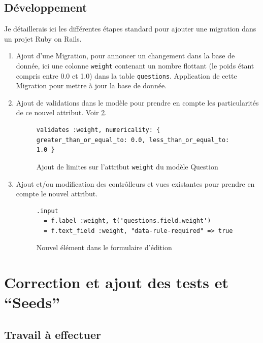 \documentclass[12pt,a4paper]{book}
\begin{document}
\subsection{Développement}

Je détaillerais ici les différentes étapes standard pour ajouter une migration dans un projet Ruby on Rails.

\begin{enumerate}
  \item Ajout d'une Migration, pour annoncer un changement dans la base de donnée, ici une colonne \texttt{weight} contenant un nombre flottant (le poids étant compris entre 0.0 et 1.0) dans la table \texttt{questions}. Application de cette Migration pour mettre à jour la base de donnée.
  \item Ajout de validations dans le modèle pour prendre en compte les particularités de ce nouvel attribut. Voir \cref{fig.weight_validation}.
  
  \begin{figure}[h]
  \lstset{language=ruby}
  \begin{lstlisting}
validates :weight, numericality: { greater_than_or_equal_to: 0.0, less_than_or_equal_to: 1.0 }
  \end{lstlisting}
   \caption{Ajout de limites sur l'attribut \texttt{weight} du modèle Question}
  \label{fig.weight_validation}
  \end{figure}
  \item Ajout et/ou modification des contrôlleurs et vues existantes pour prendre en compte le nouvel attribut.

  \begin{figure}[h]
  \lstset{language=ruby}
  \begin{lstlisting}
.input
  = f.label :weight, t('questions.field.weight')
  = f.text_field :weight, "data-rule-required" => true
  \end{lstlisting}
   \caption{Nouvel élément dans le formulaire d'édition}
  \label{fig.weight_validation}
  \end{figure}
  
\end{enumerate}

\section{Correction et ajout des tests et ``Seeds''}

\label{section.tests_seeds_dev}

\subsection{Travail à effectuer}
\end{document}
